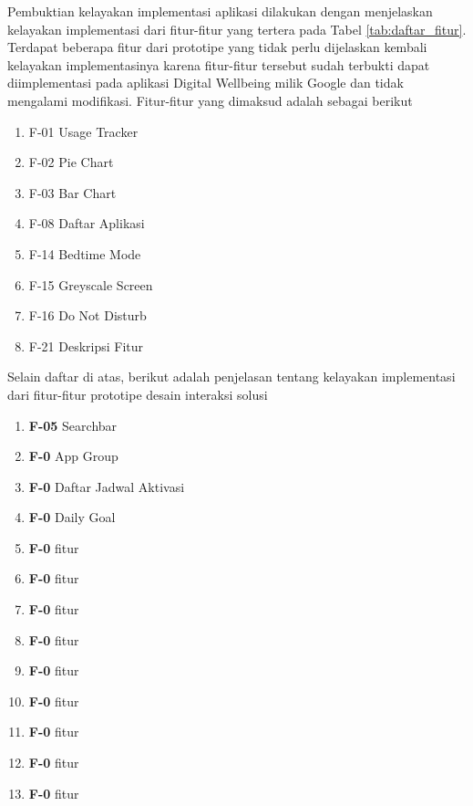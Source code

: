Pembuktian kelayakan implementasi aplikasi dilakukan dengan menjelaskan kelayakan implementasi dari fitur-fitur yang tertera pada Tabel \ref{tab:daftar_fitur}. Terdapat beberapa fitur dari prototipe yang tidak perlu dijelaskan kembali kelayakan implementasinya karena fitur-fitur tersebut sudah terbukti dapat diimplementasi pada aplikasi Digital Wellbeing milik Google dan tidak mengalami modifikasi. Fitur-fitur yang dimaksud adalah sebagai berikut

\begin{enumerate}
  \item F-01 Usage Tracker
  \item F-02 Pie Chart
  \item F-03 Bar Chart
  \item F-08 Daftar Aplikasi
  \item F-14 Bedtime Mode
  \item F-15 Greyscale Screen
  \item F-16 Do Not Disturb
  \item F-21 Deskripsi Fitur
\end{enumerate}

Selain daftar di atas, berikut adalah penjelasan tentang kelayakan implementasi dari fitur-fitur prototipe desain interaksi solusi

\begin{enumerate}
  \item \textbf{F-05} Searchbar
  \subitem
    
  \item \textbf{F-0} App Group
  \subitem
    
  \item \textbf{F-0} Daftar Jadwal Aktivasi
  \subitem
    
  \item \textbf{F-0} Daily Goal
  \subitem
    
  \item \textbf{F-0} fitur
  \subitem
    
  \item \textbf{F-0} fitur
  \subitem
    
  \item \textbf{F-0} fitur
  \subitem
    
  \item \textbf{F-0} fitur
  \subitem
    
  \item \textbf{F-0} fitur
  \subitem
    
  \item \textbf{F-0} fitur
  \subitem
    
  \item \textbf{F-0} fitur
  \subitem
    
  \item \textbf{F-0} fitur
  \subitem
    
  \item \textbf{F-0} fitur
  \subitem
    
\end{enumerate}